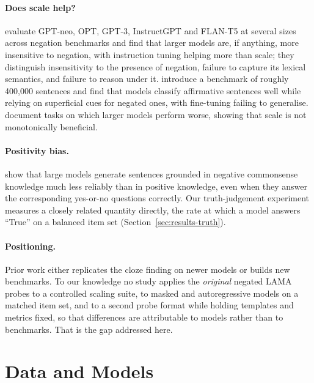 \documentclass{article}
\begin{document}
\paragraph{Does scale help?} \citet{truong2023} evaluate GPT-neo, OPT, GPT-3, InstructGPT and FLAN-T5 at several
sizes across negation benchmarks and find that larger models are, if anything, more insensitive to negation, with instruction tuning helping more than scale; they
distinguish insensitivity to the presence of negation, failure to capture its lexical semantics, and
failure to reason under it. \citet{garciaferrero2023} introduce a benchmark of roughly 400{,}000
sentences and find that models classify affirmative sentences well while relying on superficial cues
for negated ones, with fine-tuning failing to generalise. \citet{mckenzie2023} document tasks on which
larger models perform worse, showing that scale is not monotonically beneficial.

\paragraph{Positivity bias.} \citet{chen2023} show that large models generate sentences grounded in negative commonsense knowledge much less reliably than in positive knowledge, even when they answer the corresponding yes-or-no questions correctly. Our
truth-judgement experiment measures a closely related quantity directly, the rate at which a model
answers ``True'' on a balanced item set (Section~\ref{sec:results-truth}).

\paragraph{Positioning.} Prior work either replicates the cloze finding on newer models or builds new
benchmarks. To our knowledge no study applies the \emph{original} negated LAMA probes to a controlled
scaling suite, to masked and autoregressive models on a matched item set, and to a second probe format while holding templates and metrics fixed,
so that differences are attributable to models rather than to benchmarks. That is the gap addressed
here.

\section{Data and Models}
\label{sec:data}
\end{document}
